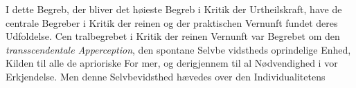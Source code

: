 \documentclass[12pt,a4paper]{book}
\begin{document}
I dette Begreb, der bliver det høieste Begreb i Kritik der
Urtheilskraft, have de centrale Begreber i Kritik der reinen
og der praktischen Vernunft fundet deres Udfoldelse. Cen\-%
tralbegrebet i Kritik der reinen Vernunft var Begrebet om den
\emph{transscendentale Apperception}, den spontane Selvbe\-%
vidstheds oprindelige Enhed, Kilden til alle de aprioriske For\-%
mer, og derigjennem til al Nødvendighed i vor Erkjendelse.
Men denne Selvbevidsthed hævedes over den Individualitetens
%
\end{document}

